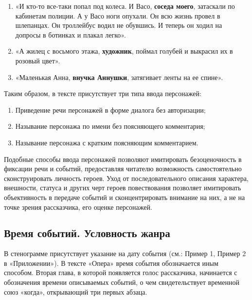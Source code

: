 \documentclass{kursa4}
\begin{document}
{{        \begin{enumerate}
          \item «И кто-то все-таки попал под колеса. И Васо, \textbf{соседа
          моего}, затаскали по кабинетам полиции. А у Васо ноги опухали. Он всю
          жизнь провел в шлепанцах. Он троллейбус водил не обувшись. И теперь он
          ходил на допросы в ботинках и плакал легко».
          \item «А жилец с восьмого этажа, \textbf{художник}, поймал голубей и
          выкрасил их в розовый цвет».
          \item «Маленькая Анна, \textbf{внучка Аннушки}, затягивает ленты на ее
          спине».
        \end{enumerate}

        Таким образом, в тексте присутствует три типа ввода персонажей: 

        \begin{enumerate}
          \item Приведение речи персонажей в форме диалога без авторизации;
          \item Называние персонажа по имени без поясняющего комментария;
          \item Называние персонажа с кратким поясняющим комментарием.
        \end{enumerate}

        Подобные способы ввода персонажей позволяют имитировать
        безоценочность в фиксации речи и событий, предоставляя читателю
        возможность самостоятельно сконструировать личность героев. Уход от
        последовательного описания характера, внешности, статуса и других черт
        героев повествования позволяет имитировать объективность в передаче
        событий и сконцентрировать внимание на них, а не на точке зрения
        рассказчика, его оценке персонажей. 

      \subsection{Время событий. Условность жанра}

        В стенограмме присутствует указание на дату события (см.: Пример
        1, Пример 2 в «Приложении»). В тексте «Опера» время события
        обозначается иным способом. Вторая глава, в которой появляется голос
        рассказчика, начинается с обозначения времени описываемых событий, о
        чем свидетельствует временной союз «когда», открывающий три первых
        абзаца. 

}}
\end{document}
